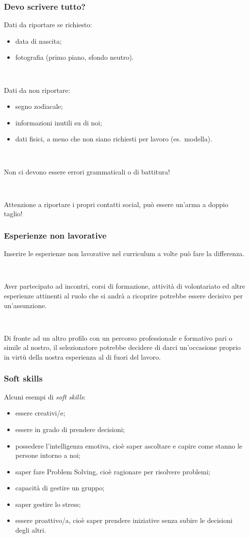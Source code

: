 \documentclass[handout]{beamer}
\begin{document}
\begin{frame}
\frametitle{Devo scrivere tutto?}
Dati da riportare se richiesto:
\begin{itemize}
  \item data di nascita;\pause
  \item fotografia (primo piano, sfondo neutro).\pause
\end{itemize}

~

Dati da non riportare:
\begin{itemize}
  \item segno zodiacale;\pause
  \item informazioni inutili su di noi;\pause
  \item dati fisici, a meno che non siano richiesti per lavoro (es.~modella).\pause
\end{itemize}

~

Non ci devono essere errori grammaticali o di battitura!\pause

~

Attenzione a riportare i propri contatti social, può essere un'arma a doppio taglio!
\end{frame}


\begin{frame}
\frametitle{Esperienze non lavorative}
Inserire le esperienze non lavorative nel curriculum a volte può \alert{fare la differenza}.\pause

~

Aver partecipato ad incontri, corsi di formazione, attività di volontariato ed altre esperienze attinenti al ruolo che si andrà a ricoprire potrebbe essere decisivo per un'assunzione.\pause

~

Di fronte ad un altro profilo con un percorso professionale e formativo pari o simile al nostro, il selezionatore potrebbe decidere di darci un'occasione proprio in virtù della nostra \alert{esperienza al di fuori del lavoro}.
\end{frame}



\begin{frame}
\frametitle{Soft skills}
Alcuni esempi di \emph{soft skills}:
\begin{itemize}
  \item essere creativi/e;\pause
  \item essere in grado di prendere decisioni;\pause
  \item possedere l'intelligenza emotiva, cioè saper ascoltare e capire come stanno le persone intorno a noi;\pause
  \item saper fare Problem Solving, cioè ragionare per risolvere problemi;\pause
  \item capacità di gestire un gruppo;\pause
  \item saper gestire lo stress;\pause
  \item essere proattivo/a, cioè saper prendere iniziative senza subire le decisioni degli altri.
\end{itemize}
  

\end{frame}
\end{document}
